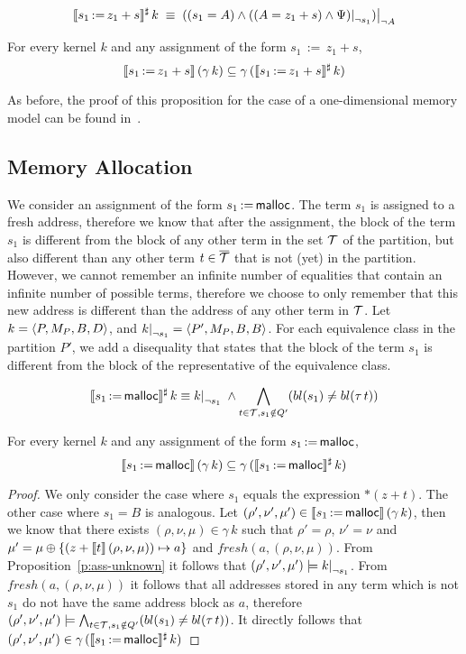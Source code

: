 \[
	\sem{s_1\,{:=}\,z_1+s}^\sharp\,k\;\equiv\;
	\restr{((s_1=A)\land\restr{((A=z_1+s)\land\Psi)}{\neg s_1})}{\neg A}
\]

\begin{proposition}\label{p:ass-definite}
	For every kernel $k$ and any assignment of the form $s_1\,{:=}\,z_1+s$,
	\[
		\llbracket s_1\,{:=}\,z_1+s\rrbracket\,(\gamma\,k) \subseteq \gamma\,(\llbracket s_1\,{:=}\,z_1+s\rrbracket^\sharp\,k)
	\]
\end{proposition}

As before, the proof of this proposition for the case of a one-dimensional memory model can be found in~\cite{2pointer}.

\subsection{Memory Allocation}

We consider an assignment of the form $s_1\,{:=}\,\textsf{malloc}$.
The term $s_1$ is assigned to a fresh address, therefore we know that after the assignment,
the block of the term $s_1$ is different from the block of any other term in the set $\mathcal{T}$ of the partition,
but also different than any other term $t \in {\overline{\mathcal{T}}}$ that is not (yet) in the partition.
However, we cannot remember an infinite number of equalities that contain an infinite number of possible terms,
therefore we choose to only remember that this new address is different than the address of any other term in $\mathcal{T}$.
Let $k = \langle P, M_P, B,D\rangle$, and $\restr{k}{\neg s_1} = \angl{P', M_P, B, B}$.
For each equivalence class in the partition $P'$, we add a disequality that states
that the block of the term $s_1$ is different from the block of the representative of the equivalence class.

\[
	\sem{s_1\,{:=}\,\text{\malloc}}^\sharp\,k \equiv
	\restr{k}{\neg s_1}\;\land
	\bigwedge_{t\in \T,s_1\notin Q'}(bl(s_1) \neq bl(\tau\,t))
\]

\begin{proposition}\label{p:ass-malloc}
	For every kernel $k$ and any assignment of the form $s_1\,{:=}\,\textsf{malloc}$,
	\[
		\llbracket s_1\,{:=}\,\textsf{malloc}\rrbracket\,(\gamma\,k) \subseteq \gamma\,(\llbracket s_1\,{:=}\,\textsf{malloc}\rrbracket^\sharp\,k)
	\]
\end{proposition}

\begin{proof}
	We only consider the case where $s_1$ equals the expression $*(z+t)$.
	The other case where $s_1 = B$ is analogous.
	Let $(\rho',\nu',\mu') \in \llbracket s_1\,{:=}\,\textsf{malloc}\rrbracket\,(\gamma\,k)$, then we know that there exists $(\rho,\nu,\mu) \in \gamma\,k$ such that $\rho'=\rho$, $\nu'=\nu$ and $\mu' =\mu\oplus\{(z+\llbracket t\rrbracket\,(\rho,\nu,\mu))\mapsto a\}$ and $fresh(a, (\rho, \nu, \mu))$.
	From Proposition~\ref{p:ass-unknown} it follows that $(\rho',\nu',\mu') \models \restr{k}{\neg s_1}$.
	From $fresh(a,( \rho,\nu,\mu))$ it follows that all addresses stored in any term which is not $s_1$ do not have the same address block as $a$, therefore $(\rho',\nu',\mu') \models \bigwedge_{t\in \mathcal{T},s_1\notin Q'}(bl(s_1) \neq bl(\tau\,t))$.
	It directly follows that $(\rho',\nu',\mu') \in \gamma\,(\llbracket s_1\,{:=}\,\textsf{malloc}\rrbracket^\sharp\,k)$
\end{proof}
